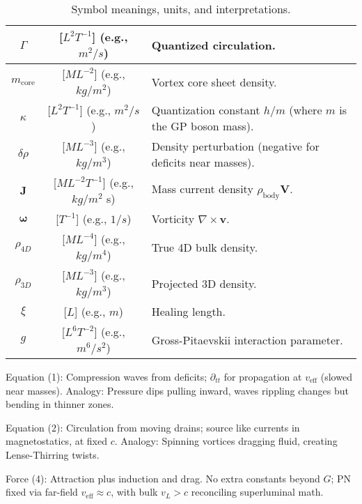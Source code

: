\documentclass{article}
\begin{document}
\begin{table}[h!]
\begin{tabularx}{\textwidth}{|c|c|Y|}
\hline
$\Gamma$ & [$L^2 T^{-1}$] (e.g., $m^2/s$) & Quantized circulation. \\
\hline
$m_{\text{core}}$ & [$M L^{-2}$] (e.g., $kg/m^2$) & Vortex core sheet density. \\
\hline
$\kappa$ & [$L^2 T^{-1}$] (e.g., $m^2/s$) & Quantization constant $h / m$ (where $m$ is the GP boson mass). \\
\hline
$\delta \rho$ & [$M L^{-3}$] (e.g., $kg/m^3$) & Density perturbation (negative for deficits near masses). \\
\hline
$\mathbf{J}$ & [$M L^{-2} T^{-1}$] (e.g., $kg/m^2$ s) & Mass current density $\rho_{\text{body}} \mathbf{V}$.\protect\footnotemark \\
\hline
$\boldsymbol{\omega}$ & [$T^{-1}$] (e.g., $1/s$) & Vorticity $\nabla \times \mathbf{v}$. \\
\hline
$\rho_{4D}$ & [$M L^{-4}$] (e.g., $kg/m^4$) & True 4D bulk density. \\
\hline
$\rho_{3D}$ & [$M L^{-3}$] (e.g., $kg/m^3$) & Projected 3D density. \\
\hline
$\xi$ & [$L$] (e.g., $m$) & Healing length. \\
\hline
$g$ & [$L^6 T^{-2}$] (e.g., $m^6/s^2$) & Gross-Pitaevskii interaction parameter. \\
\hline
\end{tabularx}
\caption{Symbol meanings, units, and interpretations.\protect\footnotemark}
\end{table}



Equation (1): Compression waves from deficits; $\partial_{tt}$ for propagation at $v_{\text{eff}}$ (slowed near masses). Analogy: Pressure dips pulling inward, waves rippling changes but bending in thinner zones.

Equation (2): Circulation from moving drains; source like currents in magnetostatics, at fixed $c$. Analogy: Spinning vortices dragging fluid, creating Lense-Thirring twists.

Force (4): Attraction plus induction and drag. No extra constants beyond $G$; PN fixed via far-field $v_{\text{eff}} \approx c$, with bulk $v_L > c$ reconciling superluminal math.
\end{document}
